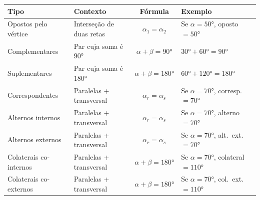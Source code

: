 \documentclass[12pt]{article}
\begin{document}
\begin{center}
\small
\begin{tabular}{|l|l|c|l|}
\hline
\rowcolor{blue!20}
\textbf{Tipo} & \textbf{Contexto} & \textbf{Fórmula} & \textbf{Exemplo} \\
\hline
Opostos pelo vértice & Interseção de duas retas & $\alpha_1 = \alpha_2$ & Se $\alpha = \ang{50}$, oposto $= \ang{50}$ \\
\hline
\rowcolor{gray!10}
Complementares & Par cuja soma é $\ang{90}$ & $\alpha + \beta = \ang{90}$ & $\ang{30} + \ang{60} = \ang{90}$ \\
\hline
Suplementares & Par cuja soma é $\ang{180}$ & $\alpha + \beta = \ang{180}$ & $\ang{60} + \ang{120} = \ang{180}$ \\
\hline
\rowcolor{gray!10}
Correspondentes & Paralelas + transversal & $\alpha_r = \alpha_s$ & Se $\alpha = \ang{70}$, corresp. $= \ang{70}$ \\
\hline
Alternos internos & Paralelas + transversal & $\alpha_r = \alpha_s$ & Se $\alpha = \ang{70}$, alterno $= \ang{70}$ \\
\hline
\rowcolor{gray!10}
Alternos externos & Paralelas + transversal & $\alpha_r = \alpha_s$ & Se $\alpha = \ang{70}$, alt.\ ext.\ $= \ang{70}$ \\
\hline
Colaterais co-internos & Paralelas + transversal & $\alpha + \beta = \ang{180}$ & Se $\alpha = \ang{70}$, colateral $= \ang{110}$ \\
\hline
\rowcolor{gray!10}
Colaterais co-externos & Paralelas + transversal & $\alpha + \beta = \ang{180}$ & Se $\alpha = \ang{70}$, col.\ ext.\ $= \ang{110}$ \\
\hline
\end{tabular}
\end{center}


\end{document}
